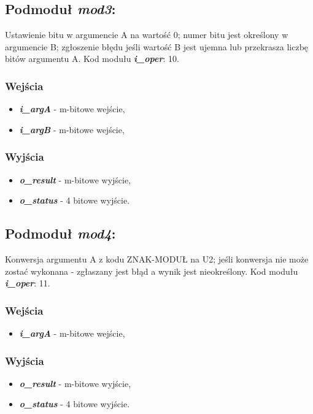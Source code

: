 \subsection{Podmoduł \emph{mod3}:}
Ustawienie bitu w argumencie A na wartość 0; numer bitu jest określony w argumencie B; zgłoszenie błędu jeśli wartość B jest ujemna lub przekrasza liczbę bitów argumentu A. Kod modułu \textbf{\emph{i\_oper}}: 10.

\subsubsection*{Wejścia}
\begin{itemize}
	\item \emph{\textbf{i\_argA}} - m-bitowe wejście,
	\item \emph{\textbf{i\_argB}} - m-bitowe wejście,
\end{itemize}
\subsubsection*{Wyjścia}
\begin{itemize}
	\item \emph{\textbf{o\_result}} - m-bitowe wyjście,
	\item \emph{\textbf{o\_status}} - 4 bitowe wyjście.
\end{itemize}

\subsection{Podmoduł \emph{mod4}:}
Konwersja argumentu A z kodu ZNAK-MODUŁ na U2; jeśli konwersja nie może zostać wykonana - zgłaszany jest błąd a wynik jest nieokreślony. Kod modułu \textbf{\emph{i\_oper}}: 11.

\subsubsection*{Wejścia}
\begin{itemize}
	\item \emph{\textbf{i\_argA}} - m-bitowe wejście,
\end{itemize}
\subsubsection*{Wyjścia}
\begin{itemize}
	\item \emph{\textbf{o\_result}} - m-bitowe wyjście,
	\item \emph{\textbf{o\_status}} - 4 bitowe wyjście.
\end{itemize}